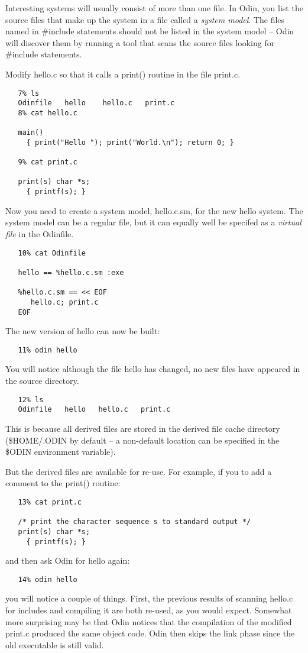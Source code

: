Interesting systems will usually consist of more than one file.
In Odin, you list the source files that make up the system in a
file called a {\em system model}.
The files named in {\ex \#include} statements
should not be listed in the system model --
Odin will discover them by running a tool
that scans the source files looking for {\ex \#include} statements.

Modify {\ex hello.c} so that it calls a {\ex print()}
routine in the file {\ex print.c}.
\begin{verbatim}
   7% ls
   Odinfile   hello    hello.c   print.c
   8% cat hello.c

   main()
     { print("Hello "); print("World.\n"); return 0; }

   9% cat print.c

   print(s) char *s;
     { printf(s); }
\end{verbatim}
Now you need to create a system model, {\ex hello.c.sm},
for the new {\ex hello} system.
The system model can be a regular file,
but it can equally well be specifed as a {\em virtual file}
in the {\ex Odinfile}.
\begin{verbatim}
   10% cat Odinfile

   hello == %hello.c.sm :exe

   %hello.c.sm == << EOF
      hello.c; print.c
   EOF
\end{verbatim}
The new version of {\ex hello} can now be built:
\begin{verbatim}
   11% odin hello
\end{verbatim}
You will notice although the file {\ex hello} has changed,
no new files have appeared in the source directory.
\begin{verbatim}
   12% ls
   Odinfile   hello   hello.c   print.c
\end{verbatim}
This is because all derived files are stored in the derived file cache
directory ({\ex \$HOME/.ODIN} by default -- a non-default location can be
specified in the {\ex \$ODIN} environment variable).

But the derived files are available for re-use.  For example, if you
to add a comment to the {\ex print()} routine:
\begin{verbatim}
   13% cat print.c

   /* print the character sequence s to standard output */
   print(s) char *s;
     { printf(s); }
\end{verbatim}
and then ask Odin for {\ex hello} again:
\begin{verbatim}
   14% odin hello
\end{verbatim}
you will notice a couple of things.
First, the previous results of scanning {\ex hello.c} for includes
and compiling it are both re-used, as you would expect.
Somewhat more surprising may be that Odin notices that the compilation of
the modified {\ex print.c} produced the same object code.
Odin then skips the link
phase since the old executable is still valid.


